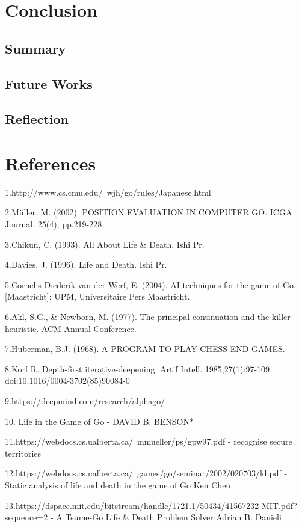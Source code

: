\documentclass{l4proj}
\begin{document}
\chapter{Conclusion}

\section{Summary}

\section{Future Works}

\section{Reflection}


\chapter{References}

1.http://www.cs.cmu.edu/~wjh/go/rules/Japanese.html

2.Müller, M. (2002). POSITION EVALUATION IN COMPUTER GO. ICGA Journal, 25(4), pp.219-228.

3.Chikun, C. (1993). All About Life \& Death. Ishi Pr.

4.Davies, J. (1996). Life and Death. Ishi Pr.

5.Cornelis Diederik van der Werf, E. (2004). AI techniques for the game of Go. [Maastricht]: UPM, Universitaire Pers Maastricht.

6.Akl, S.G., \& Newborn, M. (1977). The principal continuation and the killer heuristic. ACM Annual Conference.

7.Huberman, B.J. (1968). A PROGRAM TO PLAY CHESS END GAMES.

8.Korf R. Depth-first iterative-deepening. Artif Intell. 1985;27(1):97-109. doi:10.1016/0004-3702(85)90084-0

9.https://deepmind.com/research/alphago/

10. Life in the Game of Go  - DAVID B. BENSON*

11.https://webdocs.cs.ualberta.ca/~mmueller/ps/gpw97.pdf  - recognise secure territories

12.https://webdocs.cs.ualberta.ca/~games/go/seminar/2002/020703/ld.pdf -  Static analysis of life and death in the game of Go Ken Chen

13.https://dspace.mit.edu/bitstream/handle/1721.1/50434/41567232-MIT.pdf?sequence=2 -
 A Tsume-Go Life \& Death Problem Solver Adrian B. Danieli
\end{document}
